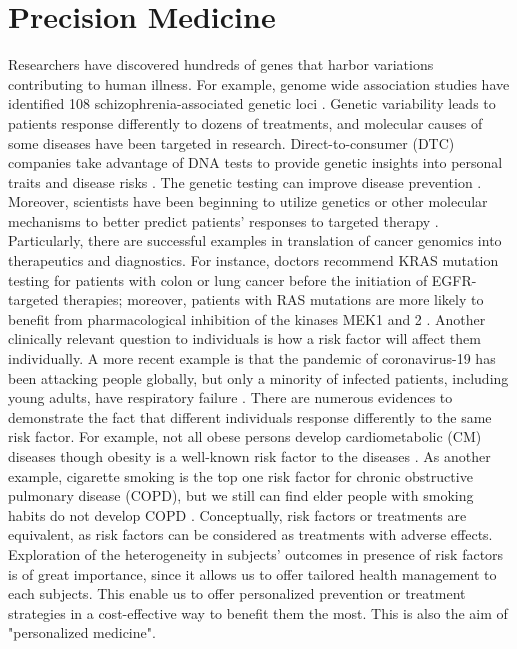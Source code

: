   \section{Precision Medicine}
    Researchers have discovered hundreds of genes that harbor variations contributing to human illness. For example, genome wide association studies have identified 108 schizophrenia-associated genetic loci \cite{schizophrenia2014biological}. Genetic variability leads to patients response differently to dozens of treatments, and molecular causes of some diseases have been targeted in research. Direct-to-consumer (DTC) companies take advantage of DNA tests to provide genetic insights into personal traits and disease risks \cite{ng2009agenda}. The genetic testing can improve disease prevention \cite{heshka2008systematic}. Moreover, scientists have been beginning to utilize genetics or other molecular mechanisms to better predict patients' responses to targeted therapy \cite{hamburg2010path}. Particularly, there are successful examples in translation of cancer genomics into therapeutics and diagnostics. For instance, doctors recommend KRAS mutation testing for patients with colon or lung cancer before the initiation of  EGFR-targeted therapies; moreover, patients with RAS mutations are more likely to  benefit from pharmacological inhibition of the kinases MEK1 and 2 \cite{lievre2008kras}. Another clinically relevant question to individuals is how a risk factor will affect them individually. A more recent example is that the pandemic of coronavirus-19 has been attacking people globally, but only a minority of infected patients, including young adults, have respiratory failure \cite{ellinghaus2020genomewide}. There are numerous evidences to demonstrate the fact that different individuals response differently to the same risk factor. For example, not all obese persons develop cardiometabolic (CM) diseases though obesity is a well-known risk factor to the diseases \cite{neeland2018cardiovascular}. As another example, cigarette smoking is the top one risk factor for chronic obstructive pulmonary disease (COPD), but we still can find elder people with smoking habits do not develop COPD \cite{van2015we}. Conceptually, risk factors or treatments are equivalent, as risk factors can be considered as treatments with adverse effects. Exploration of the heterogeneity in subjects' outcomes in presence of risk factors is of great importance, since it allows us to offer tailored health management to each subjects. This enable us to offer personalized prevention or treatment strategies in a cost-effective way to benefit them the most. This is also the aim of "personalized medicine".

